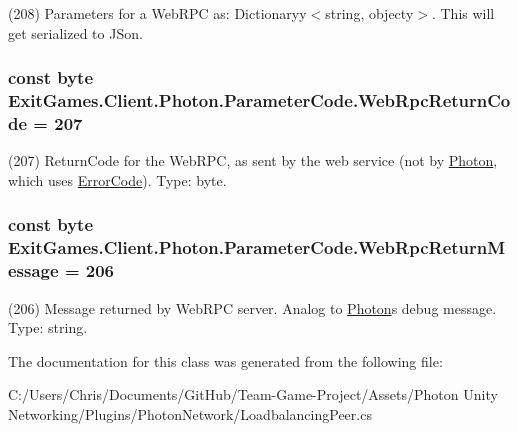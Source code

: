(208) Parameters for a Web\+R\+PC as\+: Dictionaryy$<$string, objecty$>$. This will get serialized to J\+Son.

\subsubsection[{\texorpdfstring{Web\+Rpc\+Return\+Code}{WebRpcReturnCode}}]{\setlength{\rightskip}{0pt plus 5cm}const byte Exit\+Games.\+Client.\+Photon.\+Parameter\+Code.\+Web\+Rpc\+Return\+Code = 207}\hypertarget{class_exit_games_1_1_client_1_1_photon_1_1_parameter_code_afee06b263ad9c6f084efb578b4e29bd5}{}\label{class_exit_games_1_1_client_1_1_photon_1_1_parameter_code_afee06b263ad9c6f084efb578b4e29bd5}


(207) Return\+Code for the Web\+R\+PC, as sent by the web service (not by \hyperlink{namespace_exit_games_1_1_client_1_1_photon}{Photon}, which uses \hyperlink{class_exit_games_1_1_client_1_1_photon_1_1_error_code}{Error\+Code}). Type\+: byte.

\subsubsection[{\texorpdfstring{Web\+Rpc\+Return\+Message}{WebRpcReturnMessage}}]{\setlength{\rightskip}{0pt plus 5cm}const byte Exit\+Games.\+Client.\+Photon.\+Parameter\+Code.\+Web\+Rpc\+Return\+Message = 206}\hypertarget{class_exit_games_1_1_client_1_1_photon_1_1_parameter_code_acb800c4d8182c1f318eac4fe788cd9f6}{}\label{class_exit_games_1_1_client_1_1_photon_1_1_parameter_code_acb800c4d8182c1f318eac4fe788cd9f6}


(206) Message returned by Web\+R\+PC server. Analog to \hyperlink{namespace_exit_games_1_1_client_1_1_photon}{Photon}\textquotesingle{}s debug message. Type\+: string.



The documentation for this class was generated from the following file\+:\begin{DoxyCompactItemize}
\item 
C\+:/\+Users/\+Chris/\+Documents/\+Git\+Hub/\+Team-\/\+Game-\/\+Project/\+Assets/\+Photon Unity Networking/\+Plugins/\+Photon\+Network/Loadbalancing\+Peer.\+cs\end{DoxyCompactItemize}

